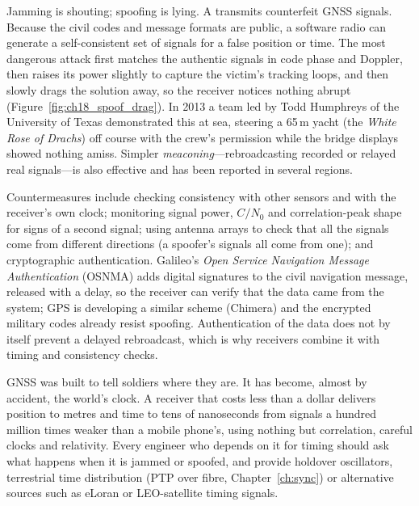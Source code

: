 
Jamming is shouting; spoofing is lying. A  transmits counterfeit GNSS signals.
Because the civil codes and message formats are public, a software radio can generate a
self-consistent set of signals for a false position or time. The most dangerous attack first
matches the authentic signals in code phase and Doppler, then raises its power slightly to capture
the victim's tracking loops, and then slowly drags the solution away, so the receiver notices
nothing abrupt (Figure~\ref{fig:ch18_spoof_drag}). In 2013 a team led by Todd Humphreys of the
University of Texas demonstrated this at sea, steering a 65\,m yacht (the \emph{White Rose of
Drachs}) off course with the crew's permission while the bridge displays showed nothing amiss.
Simpler \emph{meaconing}---rebroadcasting recorded or relayed real signals---is also effective and
has been reported in several regions.

Countermeasures include checking consistency with other sensors and with the receiver's own
clock; monitoring signal power, $C/N_0$ and correlation-peak shape for signs of a second signal;
using antenna arrays to check that all the signals come from different directions (a spoofer's
signals all come from one); and cryptographic authentication. Galileo's \emph{Open Service
Navigation Message Authentication} (OSNMA) adds digital signatures to the civil navigation
message, released with a delay, so the receiver can verify that the data came from the system;
GPS is developing a similar scheme (Chimera) and the encrypted military codes already resist
spoofing. Authentication of the data does not by itself prevent a delayed rebroadcast, which
is why receivers combine it with timing and consistency checks.


\begin{keyidea}
GNSS was built to tell soldiers where they are. It has become, almost by accident, the world's
clock. A receiver that costs less than a dollar delivers position to metres and time to tens of
nanoseconds from signals a hundred million times weaker than a mobile phone's, using
nothing but correlation, careful clocks and relativity. Every engineer who depends on it for
timing should ask what happens when it is jammed or spoofed, and provide holdover oscillators,
terrestrial time distribution (PTP over fibre, Chapter~\ref{ch:sync}) or alternative sources such
as eLoran or LEO-satellite timing signals.
\end{keyidea}


